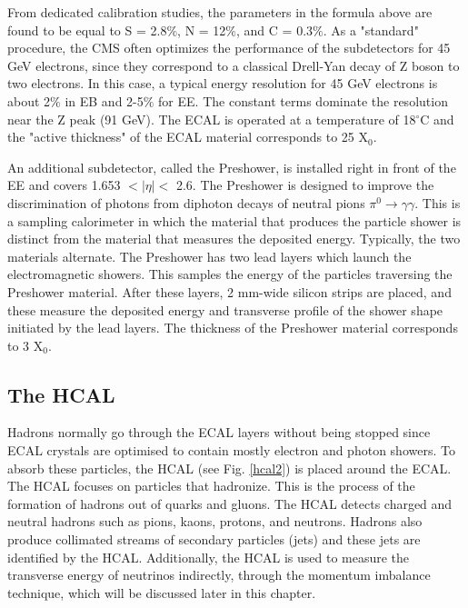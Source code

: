 \begin{normalsize}
From dedicated calibration studies, the parameters in the formula above are found to be equal to S = 2.8$\%$, N = 12$\%$, and C = 0.3$\%$. As a "standard" procedure, the CMS often optimizes the performance of the subdetectors for 45 GeV electrons, since they correspond to a classical Drell-Yan decay of Z boson to two electrons. In this case, a typical energy resolution for 45 GeV electrons is about 2$\%$ in EB and 2-5$\%$ for EE. The constant terms dominate the resolution near the Z peak (91 GeV). The ECAL is operated at a temperature of 18$^{\circ}$C and the "active thickness" of the ECAL material corresponds to 25 X$_0$. 

An additional subdetector, called the Preshower, is installed right in front of the EE and covers 1.653 $ < | \eta |  < $ 2.6. The Preshower is designed to improve the discrimination of photons from diphoton decays of neutral pions $\pi^0 \rightarrow \gamma \gamma$. This is a sampling calorimeter in which the material that produces the particle shower is distinct from the material that measures the deposited energy. Typically, the two materials alternate. The Preshower has two lead layers which launch the electromagnetic showers. This samples the energy of the particles traversing the Preshower material.  After these layers, 2 mm-wide silicon strips are placed, and these measure the deposited energy and transverse profile of the shower shape initiated by the lead layers. The thickness of the Preshower material corresponds to 3 X$_0$.




\subsection{The HCAL}

Hadrons normally go through the ECAL layers without being stopped since ECAL crystals are optimised to contain mostly electron and photon showers. To absorb these particles, the HCAL \cite{HCAL_TDR} (see Fig. \ref{hcal2}) is placed around the ECAL. The HCAL focuses on particles that hadronize. This is the process of the formation of hadrons out of quarks and gluons. The HCAL detects charged and neutral hadrons such as pions, kaons, protons, and neutrons. Hadrons also produce collimated streams of secondary particles (jets) and these jets are identified by the HCAL. Additionally, the HCAL is used to measure the transverse energy of neutrinos indirectly, through the momentum imbalance technique, which will be discussed later in this chapter. 


\end{normalsize}

